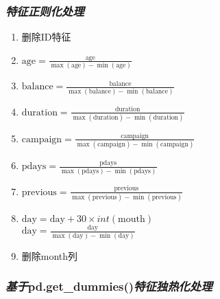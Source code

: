 \documentclass{acm_proc_article-sp}
\begin{document}
\subsubsection{\textsl{特征正则化处理}}

\newcommand{\normalizing}[1]{$\text{#1} = \frac{\text{#1}}{\max(\text{#1})-\min(\text{#1})}$}

\begin{enumerate}\setlength\itemsep{0mm}
       \item 删除ID特征
       \item \normalizing{age}
       \item \normalizing{balance}
       \item \normalizing{duration}
       \item \normalizing{campaign}
       \item \normalizing{pdays}
       \item \normalizing{previous}
       \item $\text{day} =\text{day}+30\times int(\text{mouth})$ \\
       \normalizing{day}
       \item 删除month列
\end{enumerate}
\subsubsection{\textsl{基于}pd.get\_dummies()\textsl{特征独热化处理}}
\end{document}
